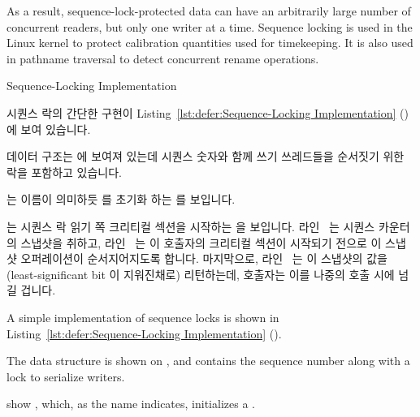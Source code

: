 As a result, sequence-lock-protected data can have an arbitrarily
large number of concurrent readers, but only one writer at a time.
Sequence locking is used in the Linux kernel to protect calibration
quantities used for timekeeping.
It is also used in pathname traversal to detect concurrent rename operations.

\fi

\begin{listing}[tb]

\caption{Sequence-Locking Implementation}
\label{lst:defer:Sequence-Locking Implementation}
\end{listing}

시퀀스 락의 간단한 구현이
Listing~\ref{lst:defer:Sequence-Locking Implementation}
() 에 보여 있습니다.
\begin{fcvref}
 데이터 구조는  에 보여져 있는데 시퀀스 숫자와
함께 쓰기 쓰레드들을 순서짓기 위한 락을 포함하고 있습니다.
\end{fcvref}
\begin{fcvref}
 는 이름이 의미하듯  를 초기화 하는
 를 보입니다.
\end{fcvref}

\begin{fcvref}
 는 시퀀스 락 읽기 쪽 크리티컬 섹션을 시작하는
 을 보입니다.
라인~ 는 시퀀스 카운터의 스냅샷을 취하고, 라인~ 는 이
호출자의 크리티컬 섹션이 시작되기 전으로 이 스냅샷 오퍼레이션이 순서지어지도록
합니다.
마지막으로, 라인~ 는 이 스냅샷의 값을 (least-significant bit 이
지워진채로) 리턴하는데, 호출자는 이를 나중의  호출 시에
넘길 겁니다.
\end{fcvref}

\iffalse

A simple implementation of sequence locks is shown in
Listing~\ref{lst:defer:Sequence-Locking Implementation}
().
\begin{fcvref}
The  data structure is shown on
, and contains
the sequence number along with a lock to serialize writers.
\end{fcvref}
\begin{fcvref}
 show , which, as the name indicates,
initializes a .
\end{fcvref}

